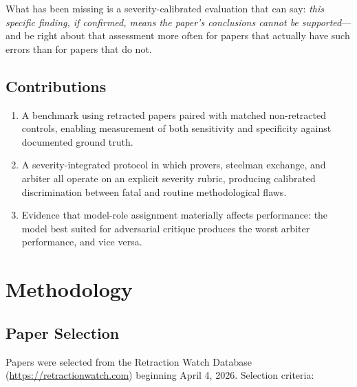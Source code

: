 \documentclass[11pt]{article}
\begin{document}
What has been missing is a severity-calibrated evaluation that can say: \emph{this specific finding, if confirmed, means the paper's conclusions cannot be supported}---and be right about that assessment more often for papers that actually have such errors than for papers that do not.

\subsection{Contributions}

\begin{enumerate}
\item A benchmark using retracted papers paired with matched non-retracted controls, enabling measurement of both sensitivity and specificity against documented ground truth.
\item A severity-integrated protocol in which provers, steelman exchange, and arbiter all operate on an explicit severity rubric, producing calibrated discrimination between fatal and routine methodological flaws.
\item Evidence that model-role assignment materially affects performance: the model best suited for adversarial critique produces the worst arbiter performance, and vice versa.
\end{enumerate}

\section{Methodology}

\subsection{Paper Selection}

Papers were selected from the Retraction Watch Database (\url{https://retractionwatch.com}) beginning April 4, 2026. Selection criteria:
\end{document}
